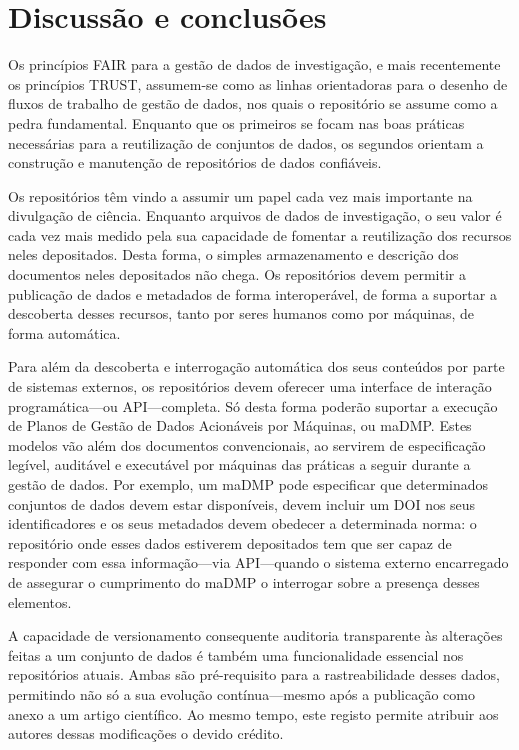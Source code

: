 \documentclass[sigconf,nonacm]{acmart}
\begin{document}
\section{Discussão e conclusões} %
\label{sec:discussao_e_conclusoes}



Os princípios FAIR para a gestão de dados de investigação, e mais recentemente os princípios TRUST, assumem-se como as linhas orientadoras para o desenho de fluxos de trabalho de gestão de dados, nos quais o repositório se assume como a pedra fundamental. Enquanto que os primeiros se focam nas boas práticas necessárias para a reutilização de conjuntos de dados, os segundos orientam a construção e manutenção de repositórios de dados confiáveis.

Os repositórios têm vindo a assumir um papel cada vez mais importante na divulgação de ciência. Enquanto arquivos de dados de investigação, o seu valor é cada vez mais medido pela sua capacidade de fomentar a reutilização dos recursos neles depositados. Desta forma, o simples armazenamento e descrição dos documentos neles depositados não chega. Os repositórios devem permitir a publicação de dados e metadados de forma interoperável, de forma a suportar a descoberta desses recursos, tanto por seres humanos como por máquinas, de forma automática.

Para além da descoberta e interrogação automática dos seus conteúdos por parte de sistemas externos, os repositórios devem oferecer uma interface de interação programática---ou API---completa. Só desta forma poderão suportar a execução de Planos de Gestão de Dados Acionáveis por Máquinas, ou maDMP. Estes modelos vão além dos documentos convencionais, ao servirem de especificação legível, auditável e executável por máquinas das práticas a seguir durante a gestão de dados. Por exemplo, um maDMP pode especificar que determinados conjuntos de dados devem estar disponíveis, devem incluir um DOI nos seus identificadores e os seus metadados devem obedecer a determinada norma: o repositório onde esses dados estiverem depositados tem que ser capaz de responder com essa informação---via API---quando o sistema externo encarregado de assegurar o cumprimento do maDMP o interrogar sobre a presença desses elementos.

A capacidade de versionamento consequente auditoria transparente às alterações feitas a um conjunto de dados é também uma funcionalidade essencial nos repositórios atuais. Ambas são pré-requisito para a rastreabilidade desses dados, permitindo não só a sua evolução contínua---mesmo após a publicação como anexo a um artigo científico. Ao mesmo tempo, este registo permite atribuir aos autores dessas modificações o devido crédito.
\end{document}
